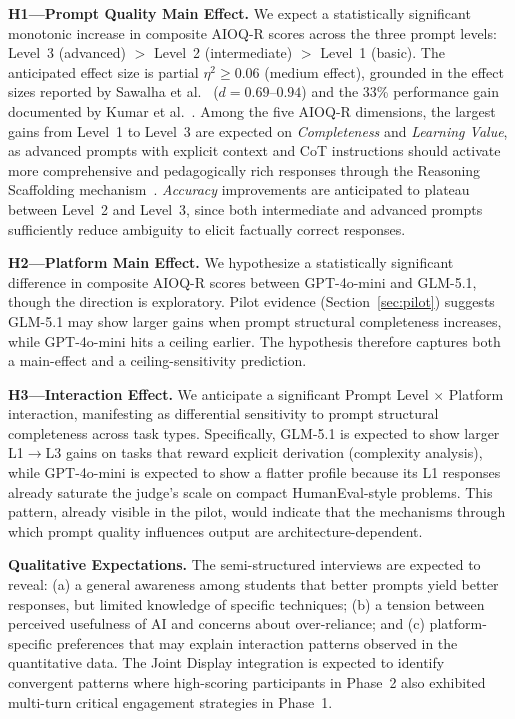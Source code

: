\documentclass[runningheads]{llncs}
\begin{document}
\textbf{H1---Prompt Quality Main Effect.} We expect a statistically significant monotonic increase in composite AIOQ-R scores across the three prompt levels: Level~3 (advanced) $>$ Level~2 (intermediate) $>$ Level~1 (basic). The anticipated effect size is partial $\eta^2 \geq 0.06$ (medium effect), grounded in the effect sizes reported by Sawalha et al.~\cite{Sawalha2024} ($d = 0.69$--$0.94$) and the 33\% performance gain documented by Kumar et al.~\cite{Kumar2025}. Among the five AIOQ-R dimensions, the largest gains from Level~1 to Level~3 are expected on \emph{Completeness} and \emph{Learning Value}, as advanced prompts with explicit context and CoT instructions should activate more comprehensive and pedagogically rich responses through the Reasoning Scaffolding mechanism~\cite{Wei2022}. \emph{Accuracy} improvements are anticipated to plateau between Level~2 and Level~3, since both intermediate and advanced prompts sufficiently reduce ambiguity to elicit factually correct responses.

\textbf{H2---Platform Main Effect.} We hypothesize a statistically significant difference in composite AIOQ-R scores between GPT-4o-mini and GLM-5.1, though the direction is exploratory. Pilot evidence (Section~\ref{sec:pilot}) suggests GLM-5.1 may show larger gains when prompt structural completeness increases, while GPT-4o-mini hits a ceiling earlier. The hypothesis therefore captures both a main-effect and a ceiling-sensitivity prediction.

\textbf{H3---Interaction Effect.} We anticipate a significant Prompt Level $\times$ Platform interaction, manifesting as differential sensitivity to prompt structural completeness across task types. Specifically, GLM-5.1 is expected to show larger L1$\to$L3 gains on tasks that reward explicit derivation (complexity analysis), while GPT-4o-mini is expected to show a flatter profile because its L1 responses already saturate the judge's scale on compact HumanEval-style problems. This pattern, already visible in the pilot, would indicate that the mechanisms through which prompt quality influences output are architecture-dependent.

\textbf{Qualitative Expectations.} The semi-structured interviews are expected to reveal: (a) a general awareness among students that better prompts yield better responses, but limited knowledge of specific techniques; (b) a tension between perceived usefulness of AI and concerns about over-reliance; and (c) platform-specific preferences that may explain interaction patterns observed in the quantitative data. The Joint Display integration is expected to identify convergent patterns where high-scoring participants in Phase~2 also exhibited multi-turn critical engagement strategies in Phase~1.
\end{document}
